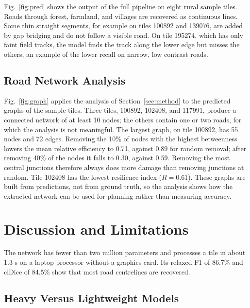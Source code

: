 \documentclass{ieeeaccess}
\begin{document}
Fig.~\ref{fig:pred} shows the output of the full pipeline on eight rural sample tiles. Roads through forest, farmland, and villages are recovered as continuous lines. Some thin straight segments, for example on tiles 100892 and 139076, are added by gap bridging and do not follow a visible road. On tile 195274, which has only faint field tracks, the model finds the track along the lower edge but misses the others, an example of the lower recall on narrow, low contrast roads.

\subsection{Road Network Analysis}

Fig.~\ref{fig:graph} applies the analysis of Section~\ref{sec:method} to the predicted graphs of the sample tiles. Three tiles, 100892, 102408, and 117991, produce a connected network of at least 10 nodes; the others contain one or two roads, for which the analysis is not meaningful. The largest graph, on tile 100892, has 55 nodes and 72 edges. Removing the 10\% of nodes with the highest betweenness lowers the mean relative efficiency to 0.71, against 0.89 for random removal; after removing 40\% of the nodes it falls to 0.30, against 0.59. Removing the most central junctions therefore always does more damage than removing junctions at random. Tile 102408 has the lowest resilience index ($R = 0.61$). These graphs are built from predictions, not from ground truth, so the analysis shows how the extracted network can be used for planning rather than measuring accuracy.


\section{Discussion and Limitations}
\label{sec:discussion}

The network has fewer than two million parameters and processes a tile in about 1.3 s on a laptop processor without a graphics card. Its relaxed F1 of 86.7\% and clDice of 84.5\% show that most road centrelines are recovered.

\subsection{Heavy Versus Lightweight Models}
\end{document}
